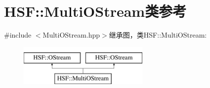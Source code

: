 \hypertarget{classHSF_1_1MultiOStream}{
\section{HSF::MultiOStream类参考}
\label{classHSF_1_1MultiOStream}
}


{\ttfamily \#include $<$MultiOStream.hpp$>$}继承图，类HSF::MultiOStream:\begin{figure}[H]
\begin{center}
\leavevmode
\includegraphics[height=2cm]{classHSF_1_1MultiOStream}
\end{center}
\end{figure}
